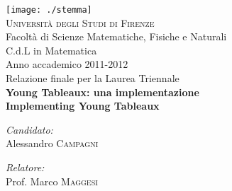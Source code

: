 \begin{titlepage}
\begin{center}

\texttt{[image: ./stemma]}~\\[1cm]

\textsc{\LARGE Universit\`a degli Studi di Firenze}\\[1.5cm]

\LARGE Facolt\`a di Scienze Matematiche, Fisiche e Naturali\\
\LARGE C.d.L in Matematica\\[0.5cm]

\Large Anno accademico 2011-2012\\
\Large Relazione finale per la Laurea Triennale\\[1.5cm]

{ \huge \bfseries Young Tableaux: una implementazione}\\[1.0cm]
{ \LARGE \bfseries Implementing Young Tableaux}\\[0.4cm]


\vfill


\begin{minipage}{0.4\textwidth}
\begin{flushleft} \large
\emph{Candidato:}\\
Alessandro \textsc{Campagni}
\end{flushleft}
\end{minipage}
\begin{minipage}{0.4\textwidth}
\begin{flushright} \large
\emph{Relatore:} \\
Prof. Marco \textsc{Maggesi}
\end{flushright}
\end{minipage}

\end{center}
\end{titlepage}
